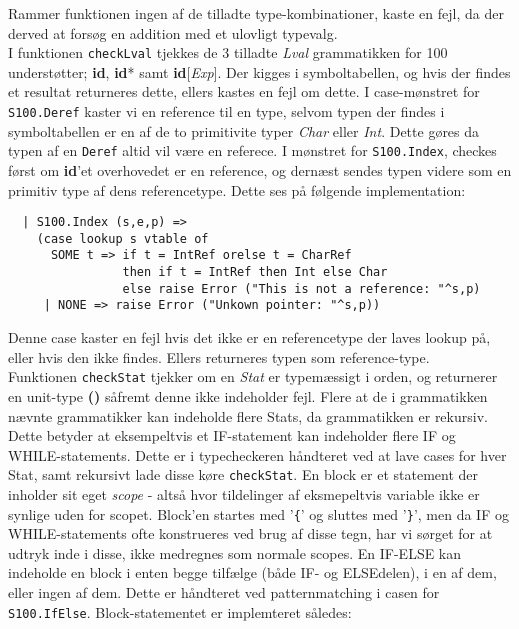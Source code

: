\documentclass[12pt]{article}
\begin{document}
Rammer funktionen ingen af de tilladte type-kombinationer, kaste en fejl, da der derved at forsøg en addition med et ulovligt typevalg. \\

I funktionen \texttt{checkLval} tjekkes de 3 tilladte \textit{Lval} grammatikken for 100 understøtter; \textbf{id}, \textbf{id}* samt \textbf{id}[\textit{Exp}]. Der kigges i symboltabellen, og hvis der findes et resultat returneres dette, ellers kastes en fejl om dette. I case-mønstret for \texttt{S100.Deref} kaster vi en reference til en type, selvom typen der findes i symboltabellen er en af de to primitivite typer \textit{Char} eller \textit{Int}. Dette gøres da typen af en \texttt{Deref} altid vil være en referece. I mønstret for \texttt{S100.Index}, checkes først om \textbf{id}'et overhovedet er en reference, og dernæst sendes typen videre som en primitiv type af dens referencetype. Dette ses på følgende implementation: \\

\begin{verbatim}
  | S100.Index (s,e,p) =>
    (case lookup s vtable of
      SOME t => if t = IntRef orelse t = CharRef
                then if t = IntRef then Int else Char
                else raise Error ("This is not a reference: "^s,p)
     | NONE => raise Error ("Unkown pointer: "^s,p))
\end{verbatim}

Denne case kaster en fejl hvis det ikke er en referencetype der laves lookup på, eller hvis den ikke findes. Ellers returneres typen som reference-type.\\

Funktionen \texttt{checkStat} tjekker om en \textit{Stat} er typemæssigt i orden, og returnerer en unit-type \textbf{()} såfremt denne ikke indeholder fejl. Flere at de i grammatikken nævnte grammatikker kan indeholde flere Stats, da grammatikken er rekursiv. Dette betyder at eksempeltvis et IF-statement kan indeholder flere IF og WHILE-statements. Dette er i typecheckeren håndteret ved at lave cases for hver Stat, samt rekursivt lade disse køre \texttt{checkStat}. En block er et statement der inholder sit eget \textit{scope} - altså hvor tildelinger af eksmepeltvis variable ikke er synlige uden for scopet. Block'en startes med '\texttt{\{}' og sluttes med '\texttt{\}}', men da IF og WHILE-statements ofte konstrueres ved brug af disse tegn, har vi sørget for at udtryk inde i disse, ikke medregnes som normale scopes. En IF-ELSE kan indeholde en block i enten begge tilfælge (både IF- og ELSEdelen), i en af dem, eller ingen af dem. Dette er håndteret ved patternmatching i casen for \texttt{S100.IfElse}. Block-statementet er implemteret således:\\
\end{document}
